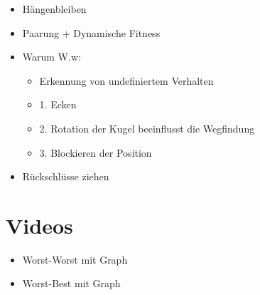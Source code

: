 \documentclass{article}
\begin{document}
\begin{itemize}
  \item Hängenbleiben
  \item Paarung + Dynamische Fitness
  \item Warum W.w:
    \begin{itemize}
      \item Erkennung von undefiniertem Verhalten
      \item 1. Ecken
      \item 2. Rotation der Kugel beeinflusst die Wegfindung
      \item 3. Blockieren der Position
    \end{itemize}
  \item Rückschlüsse ziehen
\end{itemize}


\section*{Videos}

\begin{itemize}
  \item Worst-Worst mit Graph
  \item Worst-Best mit Graph
\end{itemize}
\end{document}

